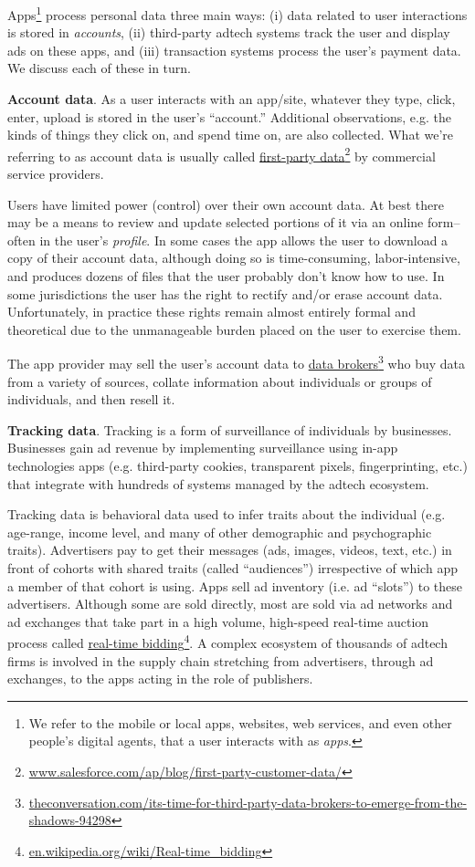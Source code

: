 \documentclass[11pt, oneside]{article}   	%
\newcommand{\hyperfootnote}[1][]{\def\ArgI{{#1}}\hyperfootnoteRelay}
\newcommand\hyperfootnoteRelay[2][]{\href{#1#2}{\ArgI}\footnote{\href{#1#2}{#2}}}
\begin{document}
Apps\footnote{We refer to the mobile or local apps, websites, web services, and even other people's digital agents, that a user interacts with as \emph{apps}.} process personal data three main ways: (i) data related to user interactions is stored in \emph{accounts}, (ii) third-party adtech systems track the user and display ads on these apps, and (iii) transaction systems process the user's payment data. We discuss each of these in turn.

\textbf{Account data}. As a user interacts with an app/site, whatever they type, click, enter, upload is stored in the user's ``account.'' Additional observations, e.g. the kinds of things they click on, and spend time on, are also collected. What we're referring to as account data is usually called \hyperfootnote[first-party data][https://]{www.salesforce.com/ap/blog/first-party-customer-data/} by commercial service providers.

Users have limited power (control) over their own account data. At best there may be a means to review and update selected portions of it via an online form--often in the user's \emph{profile}. In some cases the app allows the user to download a copy of their account data, although doing so is time-consuming, labor-intensive, and produces dozens of files that the user probably don't know how to use. In some jurisdictions the user has the right to rectify and/or erase account data. Unfortunately, in practice these rights remain almost entirely formal and theoretical due to the unmanageable burden placed on the user to exercise them. 

The app provider may sell the user's account data to \hyperfootnote[data brokers][https://]{theconversation.com/its-time-for-third-party-data-brokers-to-emerge-from-the-shadows-94298} who buy data from a variety of sources, collate information about individuals or groups of individuals, and then resell it.

\textbf{Tracking data}. Tracking is a form of surveillance of individuals by businesses. Businesses gain ad revenue by implementing surveillance using in-app technologies apps (e.g. third-party cookies, transparent pixels, fingerprinting, etc.) that integrate with hundreds of systems managed by the adtech ecosystem.

Tracking data is behavioral data used to infer traits about the individual (e.g. age-range, income level, and many of other demographic and psychographic traits). Advertisers pay to get their messages (ads, images, videos, text, etc.) in front of cohorts with shared traits (called ``audiences'') irrespective of which app a member of that cohort is using. Apps sell ad inventory (i.e. ad ``slots'') to these advertisers. Although some are sold directly, most are sold via ad networks and ad exchanges that take part in a high volume, high-speed real-time auction process called \hyperfootnote[real-time bidding][https://]{en.wikipedia.org/wiki/Real-time\_bidding}. A complex ecosystem of thousands of adtech firms is involved in the supply chain stretching from advertisers, through ad exchanges, to the apps acting in the role of publishers. 
\end{document}
